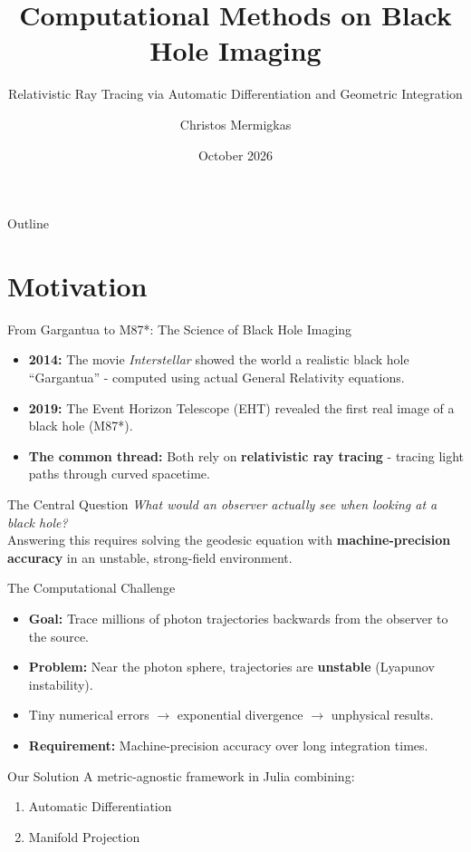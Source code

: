 \documentclass[10pt, aspectratio=169]{beamer}
\author{Christos Mermigkas}
\title{Computational Methods on Black Hole Imaging}
\subtitle{Relativistic Ray Tracing via Automatic Differentiation and Geometric Integration}
\institute{Aristotle University of Thessaloniki}
\date{October 2026}
\begin{document}
	
	\begin{frame}
		\titlepage
	\end{frame}
	
	\begin{frame}{Outline}
		\tableofcontents
	\end{frame}
	
	\section{Motivation}
	
	\begin{frame}{From Gargantua to M87*: The Science of Black Hole Imaging}
		\begin{itemize}
			\item \textbf{2014:} The movie \textit{Interstellar} showed the world a realistic black hole ``Gargantua'' - computed using actual General Relativity equations.
			\item \textbf{2019:} The Event Horizon Telescope (EHT) revealed the first real image of a black hole (M87*).
			\item \textbf{The common thread:} Both rely on \textbf{relativistic ray tracing} - tracing light paths through curved spacetime.
		\end{itemize}
		\vspace{0.3cm}
		\begin{block}{The Central Question}
			\textit{What would an observer actually see when looking at a black hole?} \\[0.2cm]
			Answering this requires solving the geodesic equation with \textbf{machine-precision accuracy} in an unstable, strong-field environment.
		\end{block}
	\end{frame}
	
	\begin{frame}{The Computational Challenge}
		\begin{itemize}
			\item \textbf{Goal:} Trace millions of photon trajectories backwards from the observer to the source.
			\item \textbf{Problem:} Near the photon sphere, trajectories are \textbf{unstable} (Lyapunov instability).
			\item Tiny numerical errors $\rightarrow$ exponential divergence $\rightarrow$ unphysical results.
			\item \textbf{Requirement:} Machine-precision accuracy over long integration times.
		\end{itemize}
		\vspace{0.3cm}
		\begin{block}{Our Solution}
			A metric-agnostic framework in Julia combining:
			\begin{enumerate}
				\item Automatic Differentiation
				\item Manifold Projection
			\end{enumerate}
		\end{block}
	\end{frame}
\end{document}
